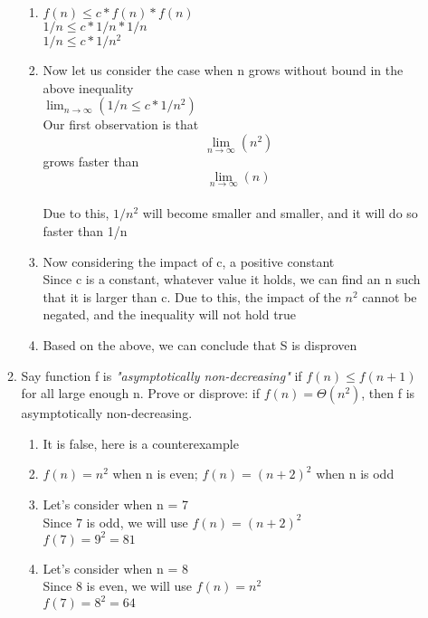 \documentclass[11pt]{article}
\begin{document}
\begin{enumerate}
\begin{enumerate}
\begin{enumerate}
            \item $f(n) \leq c * f(n) * f(n)$\\
            $1/n \leq c * 1/n * 1/n$\\
            $1/n \leq c * 1/n^2$\\
            
            \item Now let us consider the case when n grows without bound in the above inequality\\
             $\lim_{n\to\infty} (1/n \leq c * 1/n^2)$ \\
             Our first observation is that \[ \lim_{n\to\infty} (n^2) \] grows faster than \[ \lim_{n\to\infty} (n) \]\\
             Due to this, $1/n^2$ will become smaller and smaller, and it will do so faster than 1/n
             
            \item Now considering the impact of c, a positive constant \\
            Since c is a constant, whatever value it holds, we can find an n such that it is larger than c. Due to this, the impact of the $n^2$ cannot be negated, and the inequality will not hold true
            \item Based on the above, we can conclude that S is disproven
        \end{enumerate}

        \item Say function f is \textit{"asymptotically non-decreasing"} if $f(n)≤f(n+1)$ for all large enough n. Prove or disprove: if $f(n)=Θ(n^2)$, then f is asymptotically non-decreasing.
        
        \begin{enumerate}
            \item  It is false, here is a counterexample
            \item $f(n) = n^2$ when n is even; $f(n) = (n+2)^2$ when n is odd
            \item Let's consider when n = 7\\
            Since 7 is odd, we will use $f(n) = (n+2)^2$\\
            $f(7) = 9^2 = 81$
            \item Let's consider when n = 8\\
            Since 8 is even, we will use $f(n) = n^2$\\
            $f(7) = 8^2 = 64$
            

\end{enumerate}
\end{enumerate}
\end{enumerate}
\end{document}

